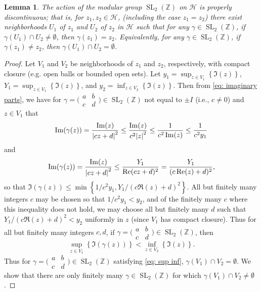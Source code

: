 \documentclass[10pt,leqno]{article}
\theoremstyle{plain}
\newtheorem{lemma}[lem]{Lemma}
\theoremstyle{definition}
\numberwithin{equation}{section}
\numberwithin{lem}{section}
\newcommand{\cbr}[1]{\left\{#1\right\}}
\DeclareMathOperator{\SL}{SL}
\newcommand{\slz}{\SL_2(\mathbb{Z})}
\begin{document}
\begin{lemma}
    The action of the modular group $\slz$ on $\mathcal H$ is properly discontinuous; that is, for $z_1,z_2\in \mathcal H$, (including the case $z_1 = z_2$) there exist neighborhoods $U_1$ of $z_1$ and $U_2$ of $z_2$ in $\mathcal H$ such that for any $\gamma\in \slz$, if $\gamma(U_1)\cap U_2\neq \emptyset$, then $\gamma(z_1) = z_2$. Equivalently, for any $\gamma\in\slz$, if $\gamma(z_1)\neq z_2$, then $\gamma(U_1)\cap U_2= \emptyset$.
\end{lemma}
\begin{proof}
    Let $V_1$ and $V_2$ be neighborhoods of $z_1$ and $z_2$, respectively, with compact closure (e.g. open balls or bounded open sets). Let $y_1 = \sup_{z\in V_1}\cbr{\Im(z)}$, $Y_1 = \sup_{z\in V_1}\cbr{\Im(z)}$, and $y_2 = \inf_{z\in V_2}\cbr{\Im(z)}$. Then from \cref{eq: imaginary parts}, we have for $\gamma = \big(\!\begin{smallmatrix}
        a & b \\ c & d
    \end{smallmatrix}\!\big)\in \slz$ not equal to $\pm I$ (i.e., $c\neq 0$) and $z\in V_1$ that \[\Im(\gamma(z)) = \frac{\Im(z)}{\abs{cz+d}^2}\leq \frac{\Im(z)}{c^2\abs{z}^2}\leq \frac{1}{c^2\Im(z)}\leq \frac{1}{c^2y_1}\] and \[\Im(\gamma(z)) = \frac{\Im(z)}{\abs{cz+d}^2}\leq \frac{Y_1}{\Re(cz+d)^2} = \frac{Y_1}{(c\Re(z)+d)^2},\] so that $\Im(\gamma(z))\leq\min\cbr{1/c^2y_1,Y_1/(c\Re(z)+d)^2}$. All but finitely many integers $c$ may be chosen so that $1/c^2y_1< y_2$, and of the finitely many $c$ where this inequality does not hold, we may choose all but finitely many $d$ such that $Y_1/(c\Re(z)+d)^2< y_2$ uniformly in $z$ (since $V_1$ has compact closure). Thus for all but finitely many integers $c,d$, if $\gamma  = \big(\!\begin{smallmatrix}
        a & b \\ c & d
    \end{smallmatrix}\!\big)\in \slz$, then \begin{equation}\label{eq: sup inf}
        \sup_{z\in V_1}\cbr{\Im(\gamma(z))}< \inf_{z\in V_2}\cbr{\Im(z)}.
    \end{equation} Thus for $\gamma = \big(\!\begin{smallmatrix}
        a & b \\ c & d
    \end{smallmatrix}\!\big)\in \slz$ satisfying \cref{eq: sup inf}, $\gamma(V_1)\cap V_2=\emptyset$. We show that there are only finitely many $\gamma\in \slz$ for which $\gamma(V_1)\cap V_2\neq\emptyset$.


\end{proof}
\end{document}
